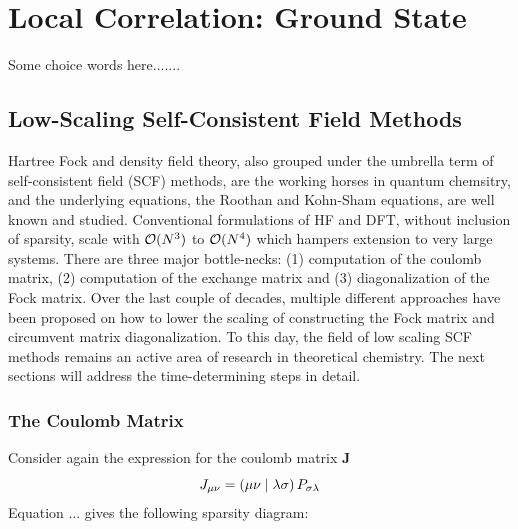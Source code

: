 \chapter{Local Correlation: Ground State}

Some choice words here.......

\section{Low-Scaling Self-Consistent Field Methods}

Hartree Fock and density field theory, also grouped under the umbrella term of self-consistent field (SCF) methods, are the working horses in quantum chemsitry, and the underlying equations, the Roothan and Kohn-Sham equations, are well known and studied. Conventional formulations of HF and DFT, without inclusion of sparsity, scale with $\mathcal{O}(N^{3})$ to $\mathcal{O}(N^{4})$ which hampers extension to very large systems. There are three major bottle-necks: (1) computation of the coulomb matrix, (2) computation of the exchange matrix and (3) diagonalization of the Fock matrix. Over the last couple of decades, multiple different approaches have been proposed on how to lower the scaling of constructing the Fock matrix and circumvent matrix diagonalization. To this day, the field of low scaling SCF methods remains an active area of research in theoretical chemistry. The next sections will address the time-determining steps in detail.

\subsection{The Coulomb Matrix}

Consider again the expression for the coulomb matrix $\mathbf{J}$ 
\begin{equation}
J_{\mu\nu} = \left( \mu\nu \mid \lambda\sigma \right) P_{\sigma\lambda}
\end{equation}
\noindent Equation ... gives the following sparsity diagram:

\begin{center}
\end{center}

